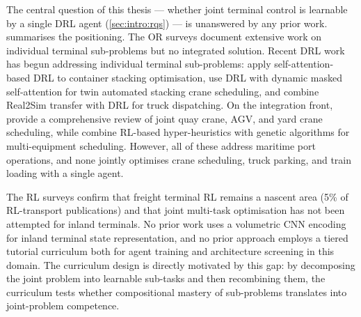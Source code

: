 The central question of this thesis --- whether joint terminal control is learnable by a single DRL agent (\cref{sec:intro:rqs}) --- is unanswered by any prior work.  summarises the positioning. The OR surveys \cite{vis2003transshipment,stahlbock2008operations,boysen2013container} document extensive work on individual terminal sub-problems but no integrated solution. Recent DRL work has begun addressing individual terminal sub-problems: \textcite{jin2023stacking} apply self-attention-based DRL to container stacking optimisation, \textcite{li2023twin} use DRL with dynamic masked self-attention for twin automated stacking crane scheduling, and \textcite{jin2024container} combine Real2Sim transfer with DRL for truck dispatching. On the integration front, \textcite{naeem2023integrated} provide a comprehensive review of joint quay crane, AGV, and yard crane scheduling, while \textcite{xu2021integrated} combine RL-based hyper-heuristics with genetic algorithms for multi-equipment scheduling. However, all of these address maritime port operations, and none jointly optimises crane scheduling, truck parking, and train loading with a single agent.

The RL surveys \cite{lai2024rl,colak2025rl} confirm that freight terminal RL remains a nascent area (5\% of RL-transport publications) and that joint multi-task optimisation has not been attempted for inland terminals. No prior work uses a volumetric CNN encoding for inland terminal state representation, and no prior approach employs a tiered tutorial curriculum both for agent training and architecture screening in this domain. The curriculum design is directly motivated by this gap: by decomposing the joint problem into learnable sub-tasks and then recombining them, the curriculum tests whether compositional mastery of sub-problems translates into joint-problem competence.

